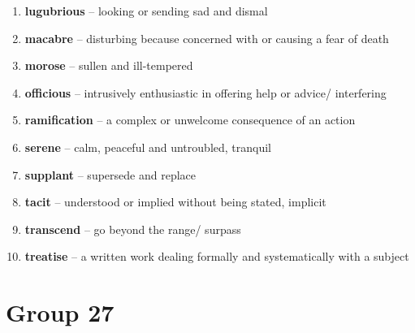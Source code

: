 \begin{enumerate}[wide,labelindent=0pt]
\item \textbf{lugubrious} -- looking or sending sad and dismal
\item \textbf{macabre} -- disturbing because concerned with or causing a fear of death
\item \textbf{morose} -- sullen and ill-tempered
\item \textbf{officious} -- intrusively enthusiastic in offering help or advice/ interfering
\item \textbf{ramification} -- a complex or unwelcome consequence of an action
\item \textbf{serene} -- calm, peaceful and untroubled, tranquil
\item \textbf{supplant} -- supersede and replace
\item \textbf{tacit} -- understood or implied without being stated, implicit
\item \textbf{transcend} -- go beyond the range/ surpass
\item \textbf{treatise} -- a written work dealing formally and systematically with a subject
\end{enumerate}

\newpage
\section{Group 27}

